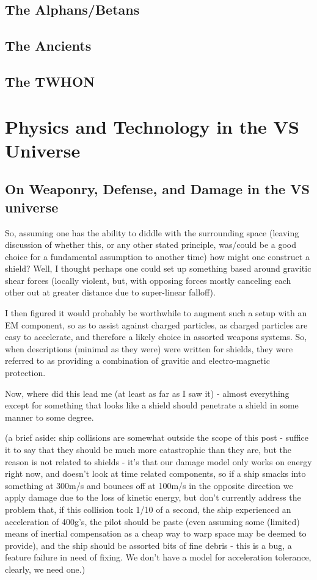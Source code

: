 \subsection{The Alphans/Betans}

\subsection{The Ancients}

\subsection{The TWHON}
 
\section{Physics and Technology in the VS Universe}

\subsection{On Weaponry, Defense, and Damage in the VS universe}

So, assuming one has the ability to diddle with the surrounding space
(leaving discussion of whether this, or any other stated principle,
was/could be a good choice for a fundamental assumption to another
time) how might one construct a shield?  Well, I thought perhaps one
could set up something based around gravitic shear forces (locally
violent, but, with opposing forces mostly canceling each other out at
greater distance due to super-linear falloff).

I then figured it would probably be worthwhile to augment such a setup
with an EM component, so as to assist against charged particles, as
charged particles are easy to accelerate, and therefore a likely
choice in assorted weapons systems. So, when descriptions (minimal as
they were) were written for shields, they were referred to as
providing a combination of gravitic and electro-magnetic protection.

Now, where did this lead me (at least as far as I saw it) - almost
everything except for something that looks like a shield should
penetrate a shield in some manner to some degree.

(a brief aside: ship collisions are somewhat outside the scope of this
post - suffice it to say that they should be much more catastrophic
than they are, but the reason is not related to shields - it's that
our damage model only works on energy right now, and doesn't look at
time related components, so if a ship smacks into something at 300m/s
and bounces off at 100m/s in the opposite direction we apply damage
due to the loss of kinetic energy, but don't currently address the
problem that, if this collision took 1/10 of a second, the ship
experienced an acceleration of 400g's, the pilot should be paste (even
assuming some (limited) means of inertial compensation as a cheap way
to warp space may be deemed to provide), and the ship should be
assorted bits of fine debris - this is a bug, a feature failure in
need of fixing. We don't have a model for acceleration tolerance,
clearly, we need one.)

